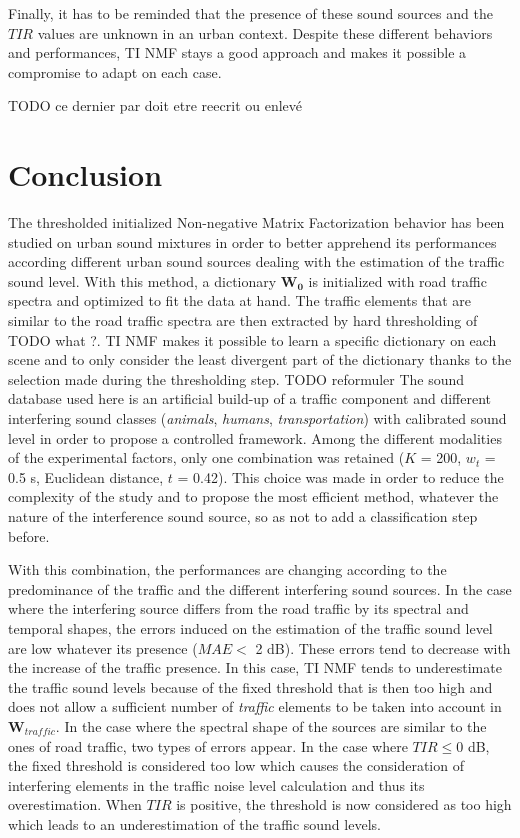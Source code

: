 \documentclass[12pt,english,twoside]{article}
\begin{document}
Finally, it has to be reminded that the presence of these sound sources and the $TIR$ values are unknown in an urban context. Despite these different behaviors and performances, TI NMF stays a good approach and makes it possible a compromise to adapt on each case.

TODO ce dernier par doit etre reecrit ou enlevé

\section{Conclusion}

The thresholded initialized Non-negative Matrix Factorization behavior has been studied on urban sound mixtures in order to better apprehend its performances according different urban sound sources dealing with the estimation of the traffic sound level.
With this method, a dictionary $\mathbf{W_0}$ is initialized
with road traffic spectra and optimized to fit the data at hand. The traffic
elements that are similar to the road traffic spectra are then extracted by hard thresholding of TODO what ?.
TI NMF makes it possible to learn a specific dictionary on each scene and to only consider the least divergent part of the dictionary thanks to the selection made during the thresholding step. TODO reformuler
The sound database used here is an artificial build-up of a traffic component and different interfering sound classes (\textit{animals}, \textit{humans}, \textit{transportation}) with calibrated sound level in order to propose a controlled framework.
Among the different modalities of the experimental factors, only one combination was retained ($K$ = 200, $w_t$ = 0.5 s, Euclidean distance, $t$ = 0.42). This choice was made in order to reduce the complexity of the study and to propose the most efficient method, whatever the nature of the interference sound source, so as not to add a classification step before.

With this combination, the performances are changing according to the predominance of the traffic and the different interfering sound sources. In the case where the interfering source differs from the road traffic by its spectral and temporal shapes, the errors induced on the estimation of the traffic sound level are low whatever its presence ($MAE <$ 2 dB). These errors tend to decrease with the increase of the traffic presence. In this case, TI NMF tends to underestimate the traffic sound levels because of the fixed threshold that is then too high and does not allow a sufficient number of \textit{traffic} elements to be taken into account in $\mathbf{W}_{traffic}$.
In the case where the spectral shape of the sources are similar to the ones of road traffic, two types of errors appear. In the case where $TIR \leq 0$ dB, the fixed threshold is considered too low which causes the consideration of interfering elements in the  traffic noise level calculation and thus its overestimation. When $TIR$ is positive, the threshold is now considered as too high which leads to an underestimation of the traffic sound levels.
\end{document}
